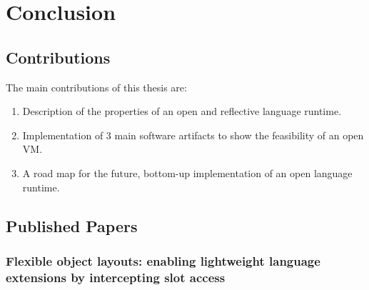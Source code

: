 

\chapter{Conclusion}
\minitoc


\section{Contributions}
The main contributions of this thesis are:
\begin{enumerate}
	\item Description of the properties of an open and reflective language runtime.
	\item Implementation of 3 main software artifacts to show the feasibility of an open VM.
	\item A road map for the future, bottom-up implementation of an open language runtime.
\end{enumerate}


\section{Published Papers}
\subsection{Flexible object layouts: enabling lightweight language extensions by intercepting slot access}

